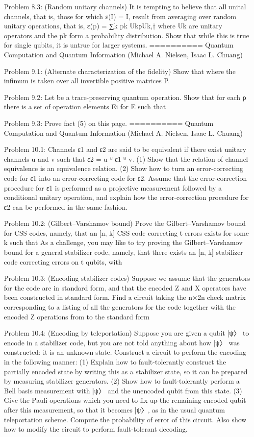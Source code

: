 \documentclass{article}
\newcommand{\0}{{$|0\rangle$}}
\newcommand{\1}{{$|1\rangle$}}
\newcommand{\2}{\frac{1}{\sqrt{2}}}
\begin{document}
Problem 8.3: (Random unitary channels) It is tempting to believe that all unital channels, that is, those for which ε(I) = I, result from averaging over random unitary operations, that is, ε(p) = ∑k pk UkρUk,† where Uk are unitary operators and the pk form a probability distribution. Show that while this is true for single qubits, it is untrue for larger systems.
==========
Quantum Computation and Quantum Information (Michael A. Nielsen, Isaac L. Chuang)

Problem 9.1: (Alternate characterization of the fidelity) Show that where the infimum is taken over all invertible positive matrices P.

Problem 9.2: Let be a trace-preserving quantum operation. Show that for each ρ there is a set of operation elements {Ei} for E such that

Problem 9.3: Prove fact (5) on this page.
==========
Quantum Computation and Quantum Information (Michael A. Nielsen, Isaac L. Chuang)

Problem 10.1: Channels ε1 and ε2 are said to be equivalent if there exist unitary channels u and v such that ε2 = u º ε1 º v. (1) Show that the relation of channel equivalence is an equivalence relation. (2) Show how to turn an error-correcting code for ε1 into an error-correcting code for ε2. Assume that the error-correction procedure for ε1 is performed as a projective measurement followed by a conditional unitary operation, and explain how the error-correction procedure for ε2 can be performed in the same fashion.

Problem 10.2: (Gilbert–Varshamov bound) Prove the Gilbert–Varshamov bound for CSS codes, namely, that an [n, k] CSS code correcting t errors exists for some k such that As a challenge, you may like to try proving the Gilbert–Varshamov bound for a general stabilizer code, namely, that there exists an [n, k] stabilizer code correcting errors on t qubits, with

Problem 10.3: (Encoding stabilizer codes) Suppose we assume that the generators for the code are in standard form, and that the encoded Z and X operators have been constructed in standard form. Find a circuit taking the n×2n check matrix corresponding to a listing of all the generators for the code together with the encoded Z operations from to the standard form

Problem 10.4: (Encoding by teleportation) Suppose you are given a qubit |ψ〉 to encode in a stabilizer code, but you are not told anything about how |ψ〉 was constructed: it is an unknown state. Construct a circuit to perform the encoding in the following manner: (1) Explain how to fault-tolerantly construct the partially encoded state by writing this as a stabilizer state, so it can be prepared by measuring stabilizer generators. (2) Show how to fault-tolerantly perform a Bell basis measurement with |ψ〉 and the unencoded qubit from this state. (3) Give the Pauli operations which you need to fix up the remaining encoded qubit after this measurement, so that it becomes |ψ〉, as in the usual quantum teleportation scheme. Compute the probability of error of this circuit. Also show how to modify the circuit to perform fault-tolerant decoding.
\end{document}
